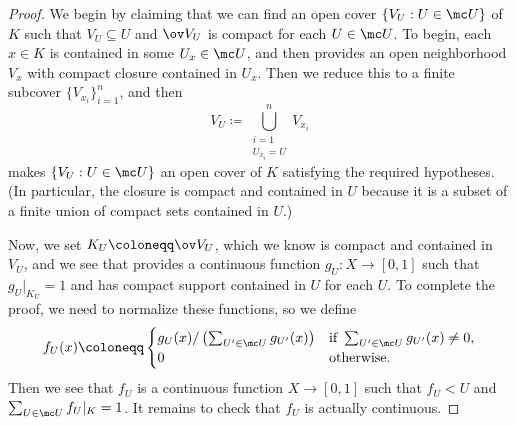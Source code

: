 \documentclass[../notes.tex]{subfiles}
\begin{document}
\begin{proof}
	We begin by claiming that we can find an open cover $\{V_U:U\in\mc U\}$ of $K$ such that $V_U\subseteq U$ and $\ov V_U$ is compact for each $U\in\mc U$. To begin, each $x\in K$ is contained in some $U_x\in\mc U$, and then  provides an open neighborhood $V_x$ with compact closure contained in $U_x$. Then we reduce this to a finite subcover $\{V_{x_i}\}_{i=1}^n$, and then
	\[V_U\coloneqq\bigcup_{\substack{i=1\\U_{x_i}=U}}^nV_{x_i}\]
	makes $\{V_U:U\in\mc U\}$ an open cover of $K$ satisfying the required hypotheses. (In particular, the closure is compact and contained in $U$ because it is a subset of a finite union of compact sets contained in $U$.)

	Now, we set $K_U\coloneqq\ov V_U$, which we know is compact and contained in $V_U$, and we see that  provides a continuous function $g_U\colon X\to[0,1]$ such that $g_U|_{K_U}=1$ and has compact support contained in $U$ for each $U$. To complete the proof, we need to normalize these functions, so we define
	\[f_U(x)\coloneqq\begin{cases}
		g_U(x)/\left(\sum_{U'\in\mc U}g_{U'}(x)\right) & \text{if }\sum_{U'\in\mc U}g_{U'}(x)\ne0, \\
		0 & \text{otherwise}.
	\end{cases}\]
	Then we see that $f_U$ is a continuous function $X\to[0,1]$ such that $f_U<U$ and $\sum_{U\in\mc U}f_U|_K=1$. It remains to check that $f_U$ is actually continuous.
\end{proof}
\end{document}
